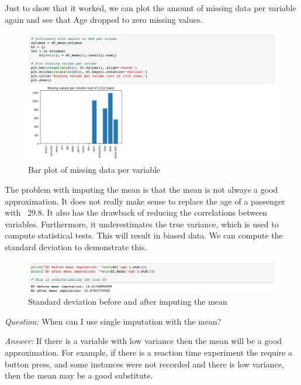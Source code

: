 \documentclass[a4paper]{article}
\begin{document}
\par\noindent Just to show that it worked, we can plot the amount of missing data per variable again and see that Age dropped to zero missing values. 

\begin{figure}[htbp]
\centering
\includegraphics[width = \textwidth]{images/python5.png}
\caption{Bar plot of missing data per variable}
\end{figure}

\par\noindent The problem with imputing the mean is that the mean is not always a good approximation. It does not really make sense to replace the age of a passenger with ~29.8. It also has the drawback of reducing the correlations between variables. Furthermore, it underestimates the true variance, which is used to compute statistical tests. This will result in biased data. We can compute the standard deviation to demonstrate this.\\

\begin{figure}[htbp]
\centering
\includegraphics[width = \textwidth]{images/python6.png}
\caption{Standard deviation before and after imputing the mean}
\end{figure}

\par\noindent \textit{Question: } When can I use single imputation with the mean? 
\par\noindent \textit{Answer: } If there is a variable with low variance then the mean will be a good approximation. For example, if there is a reaction time experiment the require a button press, and some instances were not recorded and there is low variance, then the mean may be a good substitute.\\ 
\end{document}
